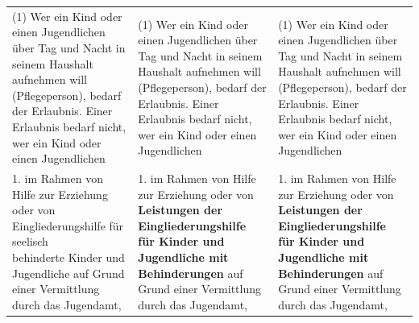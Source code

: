 \documentclass[10pt,a4paper,landscape]{article}
\begin{document}
\begin{longtable}{|L{8.2cm}|L{8.2cm}|L{8.2cm}|}
\hhline{|---|}
(1) Wer ein Kind oder einen Jugendlichen  \newline über Tag und Nacht in seinem Haushalt  \newline aufnehmen will (Pflegeperson), bedarf der  \newline Erlaubnis. Einer Erlaubnis bedarf nicht, wer  \newline ein Kind oder einen Jugendlichen & (1) Wer ein Kind oder einen Jugendlichen  \newline über Tag und Nacht in seinem Haushalt  \newline aufnehmen will (Pflegeperson), bedarf der  \newline Erlaubnis. Einer Erlaubnis bedarf nicht, wer  \newline ein Kind oder einen Jugendlichen & (1) Wer ein Kind oder einen Jugendlichen  \newline über Tag und Nacht in seinem Haushalt  \newline aufnehmen will (Pflegeperson), bedarf der  \newline Erlaubnis. Einer Erlaubnis bedarf nicht, wer  \newline ein Kind oder einen Jugendlichen \\
\hhline{|---|}
1.  \newline im Rahmen von Hilfe zur Erziehung oder  \newline von Eingliederungshilfe für \textcolor{diffred}{seelisch  \newline behinderte} Kinder und Jugendliche auf  \newline Grund einer Vermittlung durch das  \newline Jugendamt, & 1.  \newline im Rahmen von Hilfe zur Erziehung oder  \newline von \textbf{Leistungen der Eingliederungshilfe  \newline für Kinder und Jugendliche mit  \newline Behinderungen} auf Grund einer  \newline Vermittlung durch das Jugendamt, & 1.  \newline im Rahmen von Hilfe zur Erziehung oder  \newline von \textbf{Leistungen der Eingliederungshilfe  \newline für Kinder und Jugendliche mit  \newline Behinderungen} auf Grund einer  \newline Vermittlung durch das Jugendamt, \\

\end{longtable}
\end{document}
